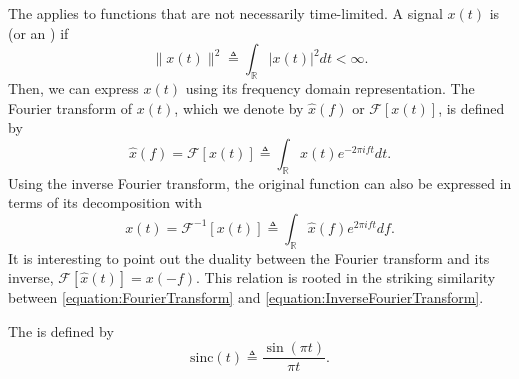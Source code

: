 The  applies to functions that are not necessarily time-limited.
A signal $x(t)$ is  (or an ) if
\begin{equation} \label{equation:L2Condition}
\| x(t) \|^2 \triangleq \int_{\mathbb{R}} | x(t) |^2 dt < \infty .
\end{equation}
Then, we can express $x(t)$ using its frequency domain representation.
The Fourier transform of $x(t)$, which we denote by $\hat{x}(f)$ or $\mathcal{F} [x(t)]$, is defined by
\begin{equation} \label{equation:FourierTransform}
\hat{x}(f) = \mathcal{F} [x(t)]
\triangleq \int_{\mathbb{R}} x(t) e^{-2 \pi i f t} dt .
\end{equation}
Using the inverse Fourier transform, the original function can also be expressed in terms of its decomposition with
\begin{equation} \label{equation:InverseFourierTransform}
x(t) =  \mathcal{F}^{-1} [x(t)] \triangleq \int_{\mathbb{R}} \hat{x}(f) e^{2 \pi i f t} df .
\end{equation}
It is interesting to point out the duality between the Fourier transform and its inverse, $\mathcal{F} \left[ \hat{x} (t) \right] = x(-f)$.
This relation is rooted in the striking similarity between \eqref{equation:FourierTransform} and \eqref{equation:InverseFourierTransform}.

\begin{definition}
The  is defined by
\[ \mathrm{sinc}(t) \triangleq \frac{\sin (\pi t)}{\pi t}. \]
\end{definition}

